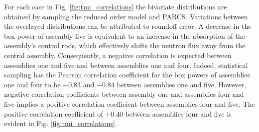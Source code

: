 For each case in Fig. \ref{fig:tmi_correlations} the bivariate distributions are obtained by sampling the reduced order model and \ac{PARCS}. Variations between the overlayed distributions can be attributed to roundoff error. A decrease in the box power of assembly five is equivalent to an increase in the absorption of the assembly's control rods, which effectively shifts the neutron flux away from the central assembly. Consequently, a negative correlation is expected between assemblies one and five and between assemblies one and four. Indeed, statistical sampling has the Pearson correlation coefficient for the box powers of assemblies one and four to be $-0.83$ and $-0.84$ between assemblies one and five. However, negative correlation coefficients between assembly one and assemblies four and five implies a positive correlation coefficient between assemblies four and five. The positive correlation coefficient of $+0.40$ between assemblies four and five is evident in Fig. \ref{fig:tmi_correlations}.  

